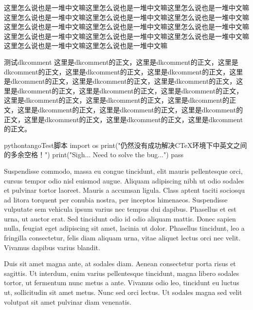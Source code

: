 \makelettertitle

\begin{cvletter}

这里怎么说也是一堆中文嘛这里怎么说也是一堆中文嘛这里怎么说也是一堆中文嘛这里怎么说也是一堆中文嘛这里怎么说也是一堆中文嘛这里怎么说也是一堆中文嘛这里怎么说也是一堆中文嘛这里怎么说也是一堆中文嘛这里怎么说也是一堆中文嘛这里怎么说也是一堆中文嘛这里怎么说也是一堆中文嘛这里怎么说也是一堆中文嘛这里怎么说也是一堆中文嘛这里怎么说也是一堆中文嘛

\begin{dkcomment}{测试dkcomment}{\faTree}
这里是dkcomment的正文，这里是dkcomment的正文，这里是dkcomment的正文，这里是dkcomment的正文，这里是dkcomment的正文，这里是dkcomment的正文，这里是dkcomment的正文，这里是dkcomment的正文，这里是dkcomment的正文，这里是dkcomment的正文，这里是dkcomment的正文，这里是dkcomment的正文，这里是dkcomment的正文，这里是dkcomment的正文，这里是dkcomment的正文，这里是dkcomment的正文，这里是dkcomment的正文，这里是dkcomment的正文，这里是dkcomment的正文，这里是dkcomment的正文。
\end{dkcomment}

\begin{dkcodeh}{python}{tango}{Test脚本}
import os
print("仍然没有成功解决CTeX环境下中英文之间的多余空格！")
print("Sigh... Need to solve the bug...")
pass
\end{dkcodeh}


Suspendisse commodo, massa eu congue tincidunt, elit mauris pellentesque orci, cursus tempor odio nisl euismod augue. Aliquam adipiscing nibh ut odio sodales et pulvinar tortor laoreet. Mauris a accumsan ligula. Class aptent taciti sociosqu ad litora torquent per conubia nostra, per inceptos himenaeos. Suspendisse vulputate sem vehicula ipsum varius nec tempus dui dapibus. Phasellus et est urna, ut auctor erat. Sed tincidunt odio id odio aliquam mattis. Donec sapien nulla, feugiat eget adipiscing sit amet, lacinia ut dolor. Phasellus tincidunt, leo a fringilla consectetur, felis diam aliquam urna, vitae aliquet lectus orci nec velit. Vivamus dapibus varius blandit.

Duis sit amet magna ante, at sodales diam. Aenean consectetur porta risus et sagittis. Ut interdum, enim varius pellentesque tincidunt, magna libero sodales tortor, ut fermentum nunc metus a ante. Vivamus odio leo, tincidunt eu luctus ut, sollicitudin sit amet metus. Nunc sed orci lectus. Ut sodales magna sed velit volutpat sit amet pulvinar diam venenatis.

\end{cvletter}


\makeletterclosing

